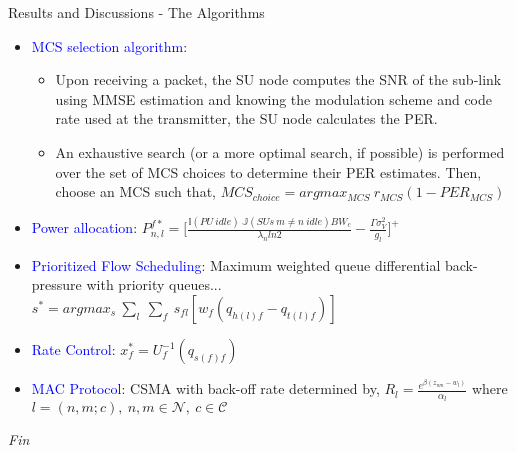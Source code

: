 \documentclass{beamer}
\begin{document}
\begin{frame}{Results and Discussions - The Algorithms}
\begin{itemize}
    \item \textcolor{blue}{MCS selection algorithm}:
    \begin{itemize}
        \item Upon receiving a packet, the SU node computes the SNR of the sub-link using MMSE estimation and knowing the modulation scheme and code rate used at the transmitter, the SU node calculates the PER.
        \item An exhaustive search (or a more optimal search, if possible) is performed over the set of MCS choices to determine their PER estimates. Then, choose an MCS such that,
        $MCS_{choice}=argmax_{MCS}\ r_{MCS}(1 - PER_{MCS})$
    \end{itemize}
    \item \textcolor{blue}{Power allocation}:
    $P_{n,l}^{f*} = \Big[\frac{\mathbb{I}(PU\ idle)\ \mathbb{J}(SUs\ m \not = n\ idle) BW_c}{\lambda_n ln 2} - \frac{\Gamma \sigma_V^2}{g_l}\Big]^+$
    \item \textcolor{blue}{Prioritized Flow Scheduling}: Maximum weighted queue differential back-pressure with priority queues...
    $s^* = argmax_s\ \sum_{l}\ \sum_{f}\ s_{fl}[w_f(q_{h(l)f} - q_{t(l)f})]$
    \item \textcolor{blue}{Rate Control}: $x_f^* = U_f^{-1}(q_{s(f)f})$
    \item \textcolor{blue}{MAC Protocol}: CSMA with back-off rate determined by,
    $R_l = \frac{e^{\beta(z_{nm} - w_l)}}{\alpha_l}$ where $l=(n,m;c),\ n,m \in \mathcal{N},\ c \in \mathcal{C}$
\end{itemize}
\vskip 1cm
\end{frame}
\begin{frame}{}
  \centering \Huge
  \emph{Fin}
\end{frame}
\end{document}
